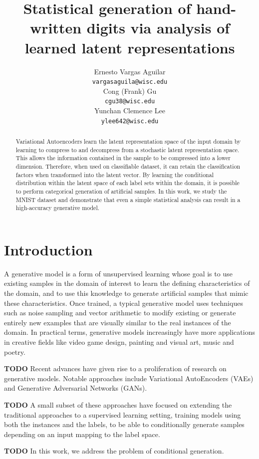 \documentclass{article}
\title{Statistical generation of hand-written digits via analysis of learned latent representations}
\author{
  Ernesto Vargas Aguilar \\
  \texttt{vargasaguila@wisc.edu} \\
   \And
   Cong (Frank) Gu \\
   \texttt{cgu38@wisc.edu} \\
   \And
   Yunchan Clemence Lee \\
   \texttt{ylee642@wisc.edu} \\
}
\begin{document}

\maketitle

\begin{abstract}
Variational Autoencoders learn the latent representation space of the input domain by learning to compress to and decompress from a stochastic latent representation space. This allows the information contained in the sample to be compressed into a lower dimension. Therefore, when used on classifiable dataset, it can retain the classification factors when transformed into the latent vector. By learning the conditional distribution within the latent space of each label sets within the domain, it is possible to perform categorical generation of artificial samples. In this work, we study the MNIST dataset and demonstrate that even a simple statistical analysis can result in a high-accuracy generative model.
\end{abstract}

\section{Introduction}

A generative model is a form of unsupervised learning whose goal is to use existing 
samples in the domain of interest to learn the defining characteristics of the domain,
and to use this knowledge to generate artificial samples that mimic these characteristics.
Once trained, a typical generative model uses techniques such as noise sampling and vector arithmetic
to modify existing or generate entirely new examples that are visually similar to the real instances of the domain.
In practical terms, generative models increasingly have more applications in creative fields like video game design, 
painting and visual art, music and poetry. \par

\textbf{TODO} Recent advances have given rise to a proliferation of research on generative models. Notable approaches include Variational AutoEncoders (VAEs) and Generative Adversarial Networks (GANs). \par
\textbf{TODO} A small subset of these approaches have focused on extending the traditional approaches to a supervised learning setting, training models using both the instances and the labels, to be able to conditionally generate samples depending on an input mapping to the label space.\par
\textbf{TODO} In this work, we address the problem of conditional generation.
\end{document}
